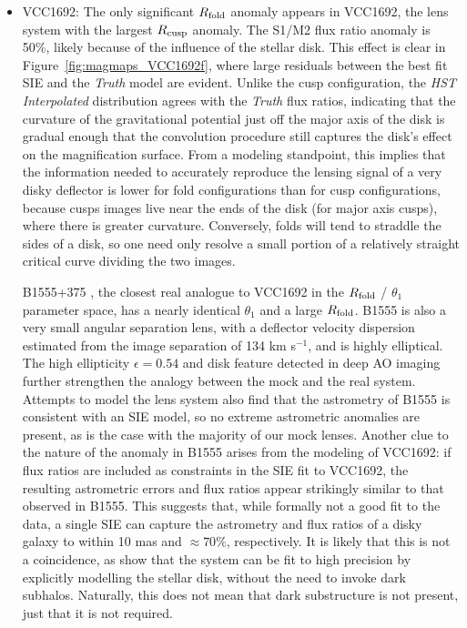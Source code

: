 \begin{itemize}
	
	\item VCC1692: The only significant $R_{\rm{fold}}$ anomaly appears in VCC1692, the lens system with the largest $R_{\rm{cusp}}$ anomaly. The S1/M2 flux ratio anomaly is 50\%, likely because of the influence of the stellar disk. This effect is clear in Figure~\ref{fig:magmaps_VCC1692f}, where large residuals between the best fit SIE and the \textit{Truth} model are evident. Unlike the cusp configuration, the \textit{HST Interpolated} distribution agrees with the \textit{Truth} flux ratios, indicating that the curvature of the gravitational potential just off the major axis of the disk is gradual enough that the convolution procedure still captures the disk's effect on the magnification surface. From a modeling standpoint, this implies that the information needed to accurately reproduce the lensing signal of a very disky deflector is lower for fold configurations than for cusp configurations, because cusps images live near the ends of the disk (for major axis cusps), where there is greater curvature. Conversely, folds will tend to straddle the sides of a disk, so one need only resolve a small portion of a relatively straight critical curve dividing the two images.
	
	\vspace{1cm} B1555+375 \citep{Marlow++99}, the closest real analogue to VCC1692 in the $R_{\rm{fold}}$ / $\theta_1$ parameter space, has a nearly identical $\theta_1$ and a large $R_{\rm{fold}}$. B1555 is also a very small angular separation lens, with a deflector velocity dispersion estimated from the image separation of 134 km s$^{-1}$, and is highly elliptical. The high ellipticity $\epsilon = 0.54$ and disk feature detected in deep AO imaging \citep{Hsueh++16} further strengthen the analogy between the mock and the real system. Attempts to model the lens system \citep{Marlow++99,MirandaJetzer07} also find that the astrometry of B1555 is consistent with an SIE model, so no extreme astrometric anomalies are present, as is the case with the majority of our mock lenses. Another clue to the nature of the anomaly in B1555 arises from the modeling of VCC1692: if flux ratios are included as constraints in the SIE fit to VCC1692, the resulting astrometric errors and flux ratios appear strikingly similar to that observed in B1555. This suggests that, while formally not a good fit to the data, a single SIE can capture the astrometry and flux ratios of a disky galaxy to within 10 mas and $\approx 70 \%$, respectively. It is likely that this is not a coincidence, as \citet{Hsueh++16} show that the system can be fit to high precision by explicitly modelling the stellar disk, without the need to invoke dark subhalos. Naturally, this does not mean that dark substructure is not present, just that it is not required.
	

\end{itemize}
